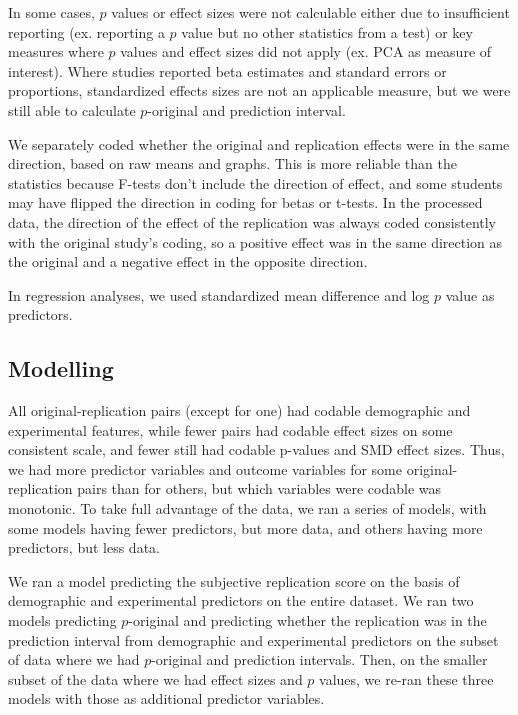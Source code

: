 \documentclass[
  english,
  a4paper,
]{article}
\begin{document}
In some cases, \(p\) values or effect sizes were not calculable either due to insufficient reporting (ex. reporting a \(p\) value but no other statistics from a test) or key measures where \(p\) values and effect sizes did not apply (ex. PCA as measure of interest). Where studies reported beta estimates and standard errors or proportions, standardized effects sizes are not an applicable measure, but we were still able to calculate \(p\)-original and prediction interval.

We separately coded whether the original and replication effects were in the same direction, based on raw means and graphs. This is more reliable than the statistics because F-tests don't include the direction of effect, and some students may have flipped the direction in coding for betas or t-tests. In the processed data, the direction of the effect of the replication was always coded consistently with the original study's coding, so a positive effect was in the same direction as the original and a negative effect in the opposite direction.

In regression analyses, we used standardized mean difference and log \(p\) value as predictors.

\hypertarget{modelling}{%
\subsection{Modelling}\label{modelling}}

All original-replication pairs (except for one) had codable demographic and experimental features, while fewer pairs had codable effect sizes on some consistent scale, and fewer still had codable p-values and SMD effect sizes. Thus, we had more predictor variables and outcome variables for some original-replication pairs than for others, but which variables were codable was monotonic. To take full advantage of the data, we ran a series of models, with some models having fewer predictors, but more data, and others having more predictors, but less data.

We ran a model predicting the subjective replication score on the basis of demographic and experimental predictors on the entire dataset. We ran two models predicting \(p\)-original and predicting whether the replication was in the prediction interval from demographic and experimental predictors on the subset of data where we had \(p\)-original and prediction intervals. Then, on the smaller subset of the data where we had effect sizes and \(p\) values, we re-ran these three models with those as additional predictor variables.
\end{document}
